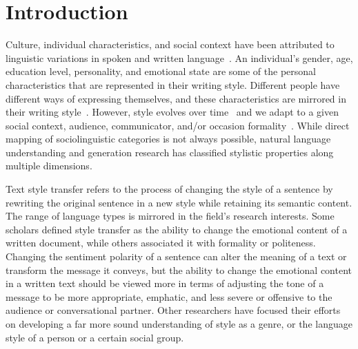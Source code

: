 \documentclass[akbc,twoside,11pt]{article}
\newcommand{\ignore}[1]{}
\begin{document}
\section{Introduction}
Culture, individual characteristics, and social context have been attributed to linguistic variations in spoken and written language~\cite{eckert2001style, coupland2007style}. \ignore{In variationist sociolinguistics, the underlying factors contributing to linguistic variations in spoken language have been extensively examined. }An individual's gender, age, education level, personality, and emotional state are some of the personal characteristics that are represented in their writing style. Different people have different ways of expressing themselves, and these characteristics are mirrored in their writing style~\cite{labov1972sociolinguistic}. However, style evolves over time~\cite{eckert2001style} and we adapt to a given social context, audience, communicator, and/or occasion formality~\cite{kiesling1998language}. While direct mapping of sociolinguistic categories is not always possible, natural language understanding and generation research has classified stylistic properties along multiple dimensions.

Text style transfer refers to the process of changing the style of a sentence by rewriting the original sentence in a new style while retaining its semantic content. The range of language types is mirrored in the field's research interests. Some scholars defined style transfer as the ability to change the emotional content of a written document, while others associated it with formality or politeness. Changing the sentiment polarity of a sentence can alter the meaning of a text or transform the message it conveys, but the ability to change the emotional content in a written text should be viewed more in terms of adjusting the tone of a message to be more appropriate, emphatic, and less severe or offensive to the audience or conversational partner. Other researchers have focused their efforts on developing a far more sound understanding of style as a genre, or the language style of a person or a certain social group. 

\ignore{In present and future intelligent interaction systems that comprehend, process, or generate speech or text, language style should be given specific care. When used on discussion forums and comment-based communities, automatic text style adjustment may become even more crucial for users to develop their communication skills (e.g., learning to write formal messages, being more polite), as well as toning down negative sentiment and neutralizing offensiveness.}
\end{document}
